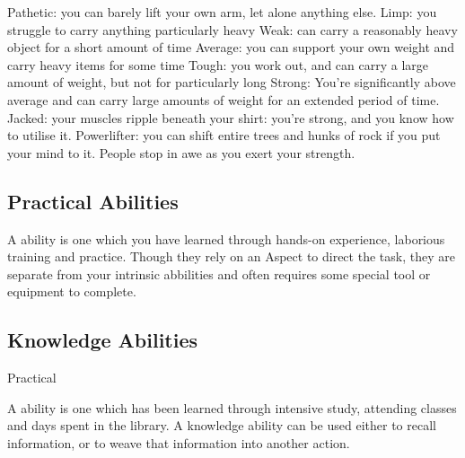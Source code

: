  \ratingTable
 {Pathetic: you can barely lift your own arm, let alone anything else.}
 {Limp: you struggle to carry anything particularly heavy}
 {Weak: can carry a reasonably heavy object for a short amount of time}
 {Average: you can support your own weight and carry heavy items for some time}
 {Tough: you work out, and can carry a large amount of weight, but not for particularly long}
 {Strong: You're significantly above average and can carry large amounts of weight for an extended period of time. }
 {Jacked: your muscles ripple beneath your shirt: you're strong, and you know how to utilise it.}
 {Powerlifter: you can shift entire trees and hunks of rock if you put your mind to it. People stop in awe as you exert your strength.}


\subsection{Practical Abilities}


A  ability is one which you have learned through hands-on experience, laborious training and practice. Though they rely on an Aspect to direct the task, they are separate from your intrinsic abbilities and often requires some special tool or equipment to complete. 











\subsection{Knowledge Abilities}{Practical} 


A  ability is one which has been learned through intensive study, attending classes and days spent in the library. A knowledge ability can be used either to recall information, or to weave that information into another action. 
	











